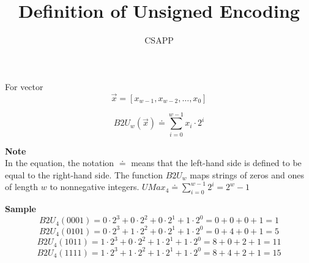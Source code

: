 \documentclass{article}
\title{Definition of Unsigned Encoding}
\author{CSAPP}
\begin{document}
\maketitle
\begin{flushleft}
    For vector
    \[\vec{x} = [x_{w-1}, x_{w-2}, \ldots, x_{0}]\]

    \[B2U_w(\vec{x}) \doteq \sum_{i=0}^{w-1} x_i \cdot 2^i\]

\textbf{Note}\\
    In the equation, the notation $\doteq$ means that the left-hand
    side is defined to be equal to the right-hand side. The function $B2U_w$ maps strings of
    zeros and ones of length $w$ to nonnegative integers. $UMax_4 \doteq \sum_{i=0}^{w-1} 2^i = 2^w - 1$

\textbf{Sample}\\
    \[B2U_{4}(0001) = 0\cdot2^3 + 0\cdot2^2 + 0\cdot2^1 + 1\cdot2^0 = 0+0+0+1 = 1\]
    \[B2U_{4}(0101) = 0\cdot2^3 + 1\cdot2^2 + 0\cdot2^1 + 1\cdot2^0 = 0+4+0+1 = 5\]
    \[B2U_{4}(1011) = 1\cdot2^3 + 0\cdot2^2 + 1\cdot2^1 + 1\cdot2^0 = 8+0+2+1 = 11\]
    \[B2U_{4}(1111) = 1\cdot2^3 + 1\cdot2^2 + 1\cdot2^1 + 1\cdot2^0 = 8+4+2+1 = 15\]
\end{flushleft}
\end{document}
